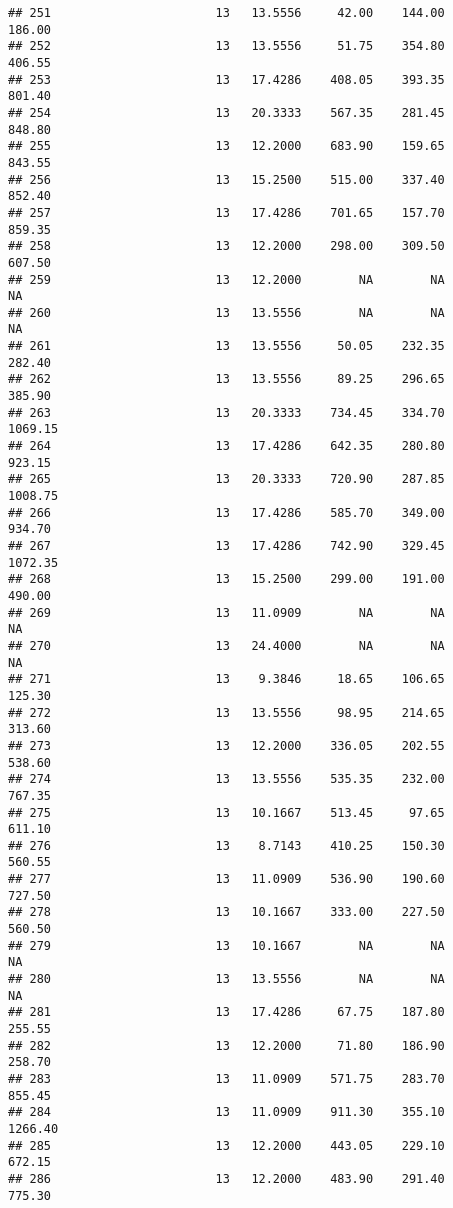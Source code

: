 \documentclass[]{article}
\begin{document}
\begin{verbatim}
## 251                       13   13.5556     42.00    144.00     186.00
## 252                       13   13.5556     51.75    354.80     406.55
## 253                       13   17.4286    408.05    393.35     801.40
## 254                       13   20.3333    567.35    281.45     848.80
## 255                       13   12.2000    683.90    159.65     843.55
## 256                       13   15.2500    515.00    337.40     852.40
## 257                       13   17.4286    701.65    157.70     859.35
## 258                       13   12.2000    298.00    309.50     607.50
## 259                       13   12.2000        NA        NA         NA
## 260                       13   13.5556        NA        NA         NA
## 261                       13   13.5556     50.05    232.35     282.40
## 262                       13   13.5556     89.25    296.65     385.90
## 263                       13   20.3333    734.45    334.70    1069.15
## 264                       13   17.4286    642.35    280.80     923.15
## 265                       13   20.3333    720.90    287.85    1008.75
## 266                       13   17.4286    585.70    349.00     934.70
## 267                       13   17.4286    742.90    329.45    1072.35
## 268                       13   15.2500    299.00    191.00     490.00
## 269                       13   11.0909        NA        NA         NA
## 270                       13   24.4000        NA        NA         NA
## 271                       13    9.3846     18.65    106.65     125.30
## 272                       13   13.5556     98.95    214.65     313.60
## 273                       13   12.2000    336.05    202.55     538.60
## 274                       13   13.5556    535.35    232.00     767.35
## 275                       13   10.1667    513.45     97.65     611.10
## 276                       13    8.7143    410.25    150.30     560.55
## 277                       13   11.0909    536.90    190.60     727.50
## 278                       13   10.1667    333.00    227.50     560.50
## 279                       13   10.1667        NA        NA         NA
## 280                       13   13.5556        NA        NA         NA
## 281                       13   17.4286     67.75    187.80     255.55
## 282                       13   12.2000     71.80    186.90     258.70
## 283                       13   11.0909    571.75    283.70     855.45
## 284                       13   11.0909    911.30    355.10    1266.40
## 285                       13   12.2000    443.05    229.10     672.15
## 286                       13   12.2000    483.90    291.40     775.30

\end{verbatim}
\end{document}
